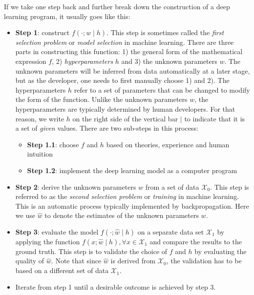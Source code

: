If we take one step back and further break down the construction of a deep learning program, it usually goes like this:
\begin{itemize}
\item {\bf Step 1}: construct $f(\cdot; w\mid h)$. This step is sometimes called the \emph{first selection problem} or \emph{model selection} in machine learning. There are three parts in constructing this function: 1) the general form of the mathematical expression $f$, 2) \emph{hyperparameters} $h$ and 3) the unknown parameters $w$. The unknown parameters will be inferred from data automatically at a later stage, but as the developer, one needs to first manually choose 1) and 2). The hyperparameters $h$ refer to a set of parameters that can be changed to modify the form of the function.
  Unlike the unknown parameters $w$, the hyperparameters are typically determined by human developers. For that reason, we write $h$ on the right side of the vertical bar $\mid$ to indicate that it is a set of \emph{given} values.
  There are two sub-steps in this process:
  \begin{itemize}
  \item {\bf Step 1.1}: choose $f$ and $h$ based on theories, experience and human intuition
  \item {\bf Step 1.2}: implement the deep learning model as a computer program
  \end{itemize}
\item {\bf Step 2}: derive the unknown parameters $w$ from a set of data $\mathcal{X}_0$. This step is referred to as the \emph{second selection problem} or \emph{training} in machine learning. This is an automatic process typically implemented by backpropagation. Here we use $\hat{w}$ to denote the estimates of the unknown parameters $w$.
\item {\bf Step 3}: evaluate the model $f(\cdot; \hat{w}\mid h)$ on a separate data set $\mathcal{X}_1$ by applying the function $f(x; \hat{w}\mid h), \forall x\in\mathcal{X}_1$ and compare the results to the ground truth. This step is to validate the choice of $f$ and $h$ by evaluating the quality of $\hat{w}$. Note that since $\hat{w}$ is derived from $\mathcal{X}_0$, the validation has to be based on a different set of data $\mathcal{X}_1$.
\item Iterate from step 1 until a desirable outcome is achieved by step 3.
\end{itemize}

